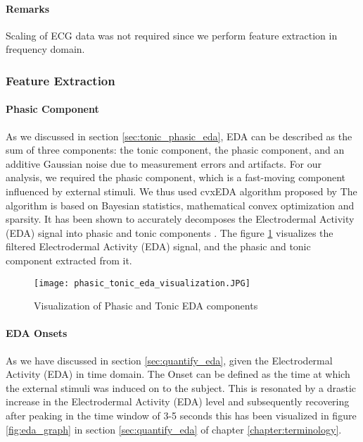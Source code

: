 \paragraph{Remarks} Scaling of ECG data was not required since we perform feature extraction in frequency domain.

\subsubsection{Feature Extraction} 
\paragraph{Phasic Component} As we discussed in section \ref{sec:tonic_phasic_eda}, EDA can be described as the sum of three components: the tonic component, the phasic component, and an additive Gaussian noise due to measurement errors and artifacts. For our analysis, we required the phasic component, which is a fast-moving component influenced by external stimuli. We thus used cvxEDA algorithm proposed by \citeauthor{greco_cvxeda:_2016} The algorithm is based on Bayesian statistics, mathematical convex optimization and sparsity. It has been shown to accurately decomposes the Electrodermal Activity (EDA) signal into phasic and tonic components \cite{greco_cvxeda:_2016}. The figure \ref{fig:phasic_tonic_visualization} visualizes the filtered Electrodermal Activity (EDA) signal, and the phasic and tonic component extracted from it. 

\begin{figure}
    \centering
    \texttt{[image: phasic\_tonic\_eda\_visualization.JPG]}
    \caption{Visualization of Phasic and Tonic EDA components}
    \label{fig:phasic_tonic_visualization}
\end{figure}


\paragraph{EDA Onsets} As we have discussed in section \ref{sec:quantify_eda}, given the Electrodermal Activity (EDA) in time domain. The Onset can be defined as the time at which the external stimuli was induced on to the subject. This is resonated by a drastic increase in the Electrodermal Activity (EDA) level and subsequently recovering after peaking in the time window of 3-5 seconds this has been visualized in figure \ref{fig:eda_graph} in section \ref{sec:quantify_eda} of chapter \ref{chapter:terminology}.

